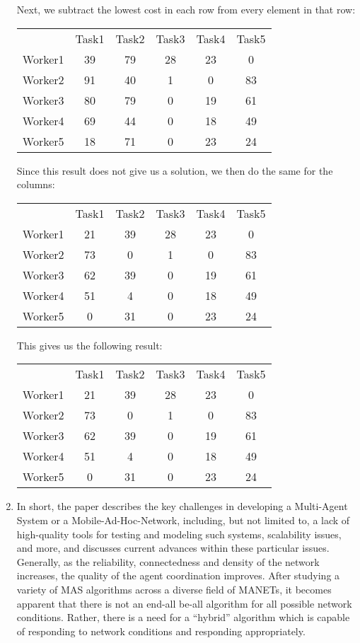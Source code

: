 \documentclass{article}
\begin{document}
\begin{enumerate}
Next, we subtract the lowest cost in each row from every element in that row:

\begin{tabular}{ c|c|c|c|c|c }
    & Task1 & Task2 & Task3 & Task4 & Task5 \\
    Worker1 & 39 & 79 & 28 & 23 &  0 \\
    Worker2 & 91 & 40 &  1 &  0 & 83 \\
    Worker3 & 80 & 79 &  0 & 19 & 61 \\
    Worker4 & 69 & 44 &  0 & 18 & 49 \\
    Worker5 & 18 & 71 &  0 & 23 & 24 \\
\end{tabular}

Since this result does not give us a solution, we then do the same for the columns:

\begin{tabular}{ c|c|c|c|c|c }
    & Task1 & Task2 & Task3 & Task4 & Task5 \\
    Worker1 & 21 & 39 & 28 & 23 &  0 \\
    Worker2 & 73 &  0 &  1 &  0 & 83 \\
    Worker3 & 62 & 39 &  0 & 19 & 61 \\
    Worker4 & 51 &  4 &  0 & 18 & 49 \\
    Worker5 &  0 & 31 &  0 & 23 & 24 \\
\end{tabular}

This gives us the following result:

\begin{tabular}{ c|c|c|c|c|c }
    & Task1 & Task2 & Task3 & Task4 & Task5 \\
    Worker1 & 21 & 39 & 28 & 23 &  \cellcolor{gray!25}0 \\
    Worker2 & 73 &  0 &  1 &  \cellcolor{gray!25}0 & 83 \\
    Worker3 & 62 & 39 &  \cellcolor{gray!25}0 & 19 & 61 \\
    Worker4 & 51 &  \cellcolor{gray!25}4 &  0 & 18 & 49 \\
    Worker5 & \cellcolor{gray!25}0 & 31 &  0 & 23 & 24 \\
\end{tabular}


\item{} %
In short, the paper describes the key challenges in developing a Multi-Agent System or a Mobile-Ad-Hoc-Network, including, but not limited to, a lack of high-quality tools for testing and modeling such systems, scalability issues, and more, and discusses current advances within these particular issues. Generally, as the reliability, connectedness and density of the network increases, the quality of the agent coordination improves. After studying a variety of MAS algorithms across a diverse field of MANETs, it becomes apparent that there is not an end-all be-all algorithm for all possible network conditions. Rather, there is a need for a ``hybrid'' algorithm which is capable of responding to network conditions and responding appropriately.

\end{enumerate}
\end{document}
